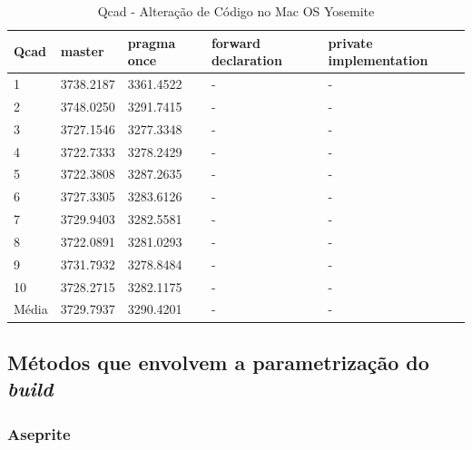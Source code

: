 \begin{apendicesenv}
\begin{table}[!h]
\tiny
\centering
\caption{Qcad - Alteração de Código no Mac OS Yosemite}
\label{tab:alteracao_de_codigo:mac:qcad}
\begin{tabular}{lllll}
\textbf{Qcad} & \textbf{master} & \textbf{pragma once}  & \textbf{forward declaration} & \textbf{private implementation}   \\ \toprule
1                        &   3738.2187      &  3361.4522 &  -   & - \\ 
2                        &   3748.0250      &  3291.7415 &  -   & - \\ 
3                        &   3727.1546      &  3277.3348 &  -   & - \\ 
4                        &   3722.7333      &  3278.2429 &  -   & - \\ 
5                        &   3722.3808      &  3287.2635  &  -   & - \\ 
6                        &   3727.3305      &  3283.6126 &  -   & - \\ 
7                        &   3729.9403      &  3282.5581 &  -   & - \\ 
8                        &   3722.0891      &  3281.0293  &  -   & - \\ 
9                        &   3731.7932      &  3278.8484 &  -   & - \\ 
10                       &   3728.2715      &  3282.1175 &  -   & - \\ \bottomrule
Média                    &   3729.7937      &  3290.4201 &  -   & - \\ 
\end{tabular}
\end{table}

\clearpage
\subsection{Métodos que envolvem a parametrização do \textit{build}}
\label{parametrizacao_apendice}

\subsubsection*{Aseprite}


\end{apendicesenv}
